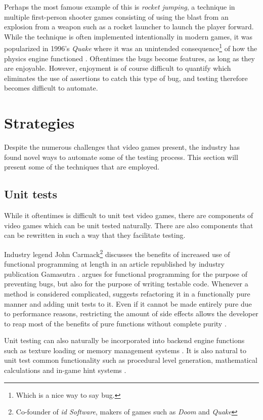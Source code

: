 \documentclass{article}
\begin{document}
    Perhaps the most famous example of this is \emph{rocket jumping}, a technique in multiple first-person shooter games consisting of using the blast from an explosion from a weapon such as a rocket launcher to launch the player forward. While the technique is often implemented intentionally in modern games, it was popularized in 1996's \emph{Quake} where it was an unintended consequence\footnote{Which is a nice way to say bug.} of how the physics engine functioned \parencite{killough2002doom}. Oftentimes the bugs become features, as long as they are enjoyable. However, enjoyment is of course difficult to quantify which eliminates the use of assertions to catch this type of bug, and testing therefore becomes difficult to automate. 

    \section{Strategies}
    Despite the numerous challenges that video games present, the industry has found novel ways to automate some of the testing process. This section will present some of the techniques that are employed.

    \subsection{Unit tests}
    While it oftentimes is difficult to unit test video games, there are components of video games which can be unit tested naturally. There are also components that can be rewritten in such a way that they facilitate testing.

    Industry legend John Carmack\footnote{Co-founder of \emph{id Software}, makers of games such as \emph{Doom} and \emph{Quake}} discusses the benefits of increased use of functional programming at length in an article republished by industry publication Gamasutra \parencite{carmack2012functional}. \textcite{carmack2012functional} argues for functional programming for the purpose of preventing bugs, but also for the purpose of writing testable code. Whenever a method is considered complicated, \textcite{carmack2012functional} suggests refactoring it in a functionally pure manner and adding unit tests to it. Even if it cannot be made entirely pure due to performance reasons, restricting the amount of side effects allows the developer to reap most of the benefits of pure functions without complete purity \parencite{carmack2012functional}.
    
    Unit testing can also naturally be incorporated into backend engine functions such as texture loading or memory management systems \parencite{gilbert2018unit}. It is also natural to unit test common functionality such as procedural level generation, mathematical calculations and in-game hint systems \parencite{gulbert2017unit}. 
\end{document}
